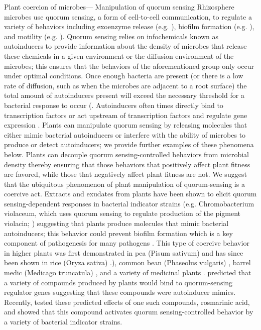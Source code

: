 \documentclass[PhD]{msu-thesis}
\begin{document}
Plant coercion of microbes— Manipulation of quorum sensing 
Rhizosphere microbes use quorum sensing, a form of cell-to-cell communication, to regulate a variety of behaviors including exoenzyme release (e.g. \cite{chernin1998}), biofilm formation (e.g. \cite{danhorn2007}), and motility (e.g. \cite{kohler2000}). Quorum sensing relies on infochemicals known as autoinducers to provide information about the density of microbes that release these chemicals in a given environment or the diffusion environment of the microbes; this ensures that the behaviors of the aforementioned group only occur under optimal conditions. Once enough bacteria are present (or there is a low rate of diffusion, such as when the microbes are adjacent to a root surface) the total amount of autoinducers present will exceed the necessary threshold for a bacterial response to occur (\cite{bassler1999,redfield2002}. Autoinducers often times directly bind to transcription factors or act upstream of transcription factors and regulate gene expression \cite{engebrecht1987}. Plants can manipulate quorum sensing by releasing molecules that either mimic bacterial autoinducers or interfere with the ability of microbes to produce or detect autoinducers; we provide further examples of these phenomena below. Plants can decouple quorum sensing-controlled behaviors from microbial density thereby ensuring that those behaviors that positively affect plant fitness are favored, while those that negatively affect plant fitness are not. We suggest that the ubiquitous phenomenon of plant manipulation of quorum-sensing is a coercive act. 
Extracts and exudates from plants have been shown to elicit quorum sensing-dependent responses in bacterial indicator strains (e.g. Chromobacterium violaceum, which uses quorum sensing to regulate production of the pigment violacin; \cite{mcclean1997}) suggesting that plants produce molecules that mimic bacterial autoinducers; this behavior could prevent biofilm formation which is a key component of pathogenesis for many pathogens \cite{perez-montano2013}. This type of coercive behavior in higher plants was first demonstrated in pea (Pisum sativum) \cite{teplitski2000} and has since been shown in rice (Oryza sativa) \cite{degrassi2007,perez-montano2013}.), common bean (Phaseolus vulgaris) \cite{perez-montano2013}, barrel medic (Medicago truncatula) \cite{gao2003}, and a variety of medicinal plants \cite{tolmacheva2014}. \cite{annapoorani2012} predicted that a variety of compounds produced by plants would bind to quorum-sensing regulator genes suggesting that these compounds were autoinducer mimics. Recently, \cite{corral-lugo2016} tested these predicted effects of one such compounds, rosmarinic acid, and showed that this compound activates quorum sensing-controlled behavior by a variety of bacterial indicator strains.
\end{document}
